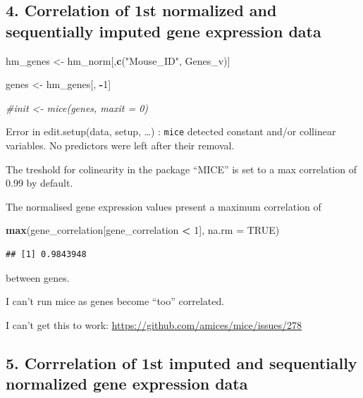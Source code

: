 \documentclass[
]{article}
\newenvironment{Shaded}{\begin{snugshade}}{\end{snugshade}}
\newcommand{\AttributeTok}[1]{\textcolor[rgb]{0.13,0.29,0.53}{#1}}
\newcommand{\CommentTok}[1]{\textcolor[rgb]{0.56,0.35,0.01}{\textit{#1}}}
\newcommand{\ConstantTok}[1]{\textcolor[rgb]{0.56,0.35,0.01}{#1}}
\newcommand{\DecValTok}[1]{\textcolor[rgb]{0.00,0.00,0.81}{#1}}
\newcommand{\FunctionTok}[1]{\textcolor[rgb]{0.13,0.29,0.53}{\textbf{#1}}}
\newcommand{\NormalTok}[1]{#1}
\newcommand{\OtherTok}[1]{\textcolor[rgb]{0.56,0.35,0.01}{#1}}
\newcommand{\SpecialCharTok}[1]{\textcolor[rgb]{0.81,0.36,0.00}{\textbf{#1}}}
\newcommand{\StringTok}[1]{\textcolor[rgb]{0.31,0.60,0.02}{#1}}
\begin{document}
\hypertarget{correlation-of-1st-normalized-and-sequentially-imputed-gene-expression-data}{%
\subsection{4. Correlation of 1st normalized and sequentially imputed
gene expression
data}\label{correlation-of-1st-normalized-and-sequentially-imputed-gene-expression-data}}

\begin{Shaded}
\begin{Highlighting}[]
\NormalTok{hm\_genes }\OtherTok{\textless{}{-}}\NormalTok{ hm\_norm[,}\FunctionTok{c}\NormalTok{(}\StringTok{"Mouse\_ID"}\NormalTok{, Genes\_v)]}


\NormalTok{genes }\OtherTok{\textless{}{-}}\NormalTok{ hm\_genes[, }\SpecialCharTok{{-}}\DecValTok{1}\NormalTok{]}

\CommentTok{\#init \textless{}{-} mice(genes, maxit = 0)}
\end{Highlighting}
\end{Shaded}

Error in edit.setup(data, setup, \ldots) : \texttt{mice} detected
constant and/or collinear variables. No predictors were left after their
removal.

The treshold for colinearity in the package ``MICE'' is set to a max
correlation of 0.99 by default.

The normalised gene expression values present a maximum correlation of

\begin{Shaded}
\begin{Highlighting}[]
\FunctionTok{max}\NormalTok{(gene\_correlation[gene\_correlation }\SpecialCharTok{\textless{}} \DecValTok{1}\NormalTok{], }\AttributeTok{na.rm =} \ConstantTok{TRUE}\NormalTok{)}
\end{Highlighting}
\end{Shaded}

\begin{verbatim}
## [1] 0.9843948
\end{verbatim}

between genes.

I can't run mice as genes become ``too'' correlated.

I can't get this to work:
\url{https://github.com/amices/mice/issues/278}

\hypertarget{corrrelation-of-1st-imputed-and-sequentially-normalized-gene-expression-data}{%
\subsection{5. Corrrelation of 1st imputed and sequentially normalized
gene expression
data}\label{corrrelation-of-1st-imputed-and-sequentially-normalized-gene-expression-data}}
\end{document}
